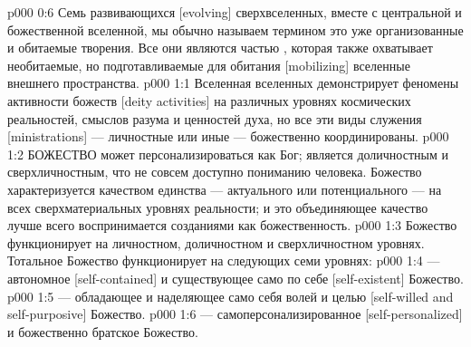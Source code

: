 \vs p000 0:6 Семь развивающихся [evolving] сверхвселенных, вместе с центральной и божественной вселенной, мы обычно называем термином  это уже организованные и обитаемые творения. Все они являются частью , которая также охватывает необитаемые, но подготавливаемые для обитания [mobilizing] вселенные внешнего пространства.
\vs p000 1:1 Вселенная вселенных демонстрирует феномены активности божеств [deity activities] на различных уровнях космических реальностей, смыслов разума и ценностей духа, но все эти виды служения [ministrations] --- личностные или иные --- божественно координированы.
\vs p000 1:2 \pc БОЖЕСТВО может персонализироваться как Бог; является доличностным и сверхличностным, что не совсем доступно пониманию человека. Божество характеризуется качеством единства --- актуального или потенциального --- на всех сверхматериальных уровнях реальности; и это объединяющее качество лучше всего воспринимается созданиями как божественность.
\vs p000 1:3 \pc Божество функционирует на личностном, доличностном и сверхличностном уровнях. Тотальное Божество функционирует на следующих семи уровнях:
\vs p000 1:4 \bibnobreakspace {} --- автономное [self\hyp{}contained] и существующее само по себе [self\hyp{}existent] Божество.
\vs p000 1:5 \bibnobreakspace {} --- обладающее и наделяющее само себя волей и целью [self\hyp{}willed and self\hyp{}purposive] Божество.
\vs p000 1:6 \bibnobreakspace {} --- самоперсонализированное [self\hyp{}personalized] и божественно братское Божество.
